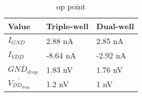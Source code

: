 
\begin{table}[H]
	\centering
	\begin{tabularx}{\columnwidth}{XXX}
		Value  & Triple-well & Dual-well \\ \hline
		$I_{GND}$                                  & 2.88 nA       & 2.85 nA      \\
		$I_{VDD}$                                  & -8.64 nA      & -2.92 nA       \\
		$\overline{GND_{drop}}$      & 1.83 nV       & 1.76 nV      \\
		$\overline{V_{DD_{drop}}}$  & 1.2 nV         & 1 nV
	\end{tabularx}
	\caption{op point}
	\label{tab_op}
\end{table}
